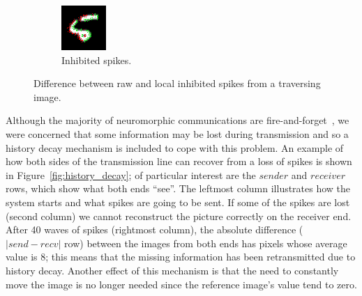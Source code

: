 \documentclass[twocolumn, a4paper]{article}
\begin{document}
\begin{figure}[htb]
\begin{subfigure}[b]{0.2\textwidth}
    \includegraphics[width=\textwidth]{post_inh_frame_262}
    \caption{Inhibited spikes.}
    \label{fig:post_inh}
  \end{subfigure}

  \caption[Difference between raw and local inhibited spikes from a traversing image (inverted images).]{Difference between raw and local inhibited spikes from a traversing image.}
  \label{fig:inh_diff}
\end{figure}

Although the majority of neuromorphic communications are fire-and-forget~\cite{Rast2015}, we were concerned that some information may be lost during transmission and so a history decay mechanism is included to cope with this problem. An example of how both sides of the transmission line can recover from a loss of spikes is shown in Figure~\ref{fig:history_decay}; of particular interest are the $sender$ and $receiver$ rows, which show what both ends ``see''. The leftmost column illustrates how the system starts and what spikes are going to be sent. If some of the spikes are lost (second column) we cannot reconstruct the picture correctly on the receiver end. After 40 waves of spikes (rightmost column), the absolute difference ($|send-recv|$ row) between the images from both ends has pixels whose average value is 8; this means that the missing information has been retransmitted due to history decay. Another effect of this mechanism is that the need to constantly move the image is no longer needed since the reference image's value tend to zero.
\end{document}
